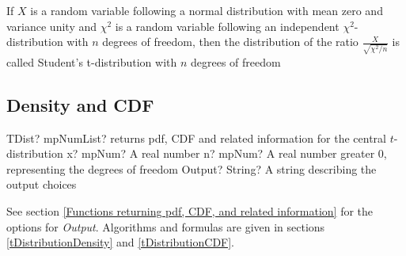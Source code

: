 If $X$ is a random variable following a normal distribution with mean zero and variance unity and $\chi^2$ is a random variable following an independent $\chi^2$-distribution with $n$ degrees of freedom, 
then the distribution of the ratio $\frac{X}{\sqrt{\chi^2 / n}}$ is called Student's t-distribution with $n$ degrees of freedom


\subsection{Density and CDF}

\begin{mpFunctionsExtract}
	\mpFunctionThree
	{TDist? mpNumList? returns pdf, CDF and related information for the central $t$-distribution}
	{x? mpNum? A real number}
	{n? mpNum? A real number greater 0, representing the degrees of freedom}
	{Output? String? A string describing the output choices}
\end{mpFunctionsExtract}


\vspace{0.3cm}
See section \ref{Functions returning pdf, CDF, and related information} for the options for {\itshape\sffamily Output}. Algorithms and formulas are given in sections \ref{tDistributionDensity} and \ref{tDistributionCDF}.


%
%

